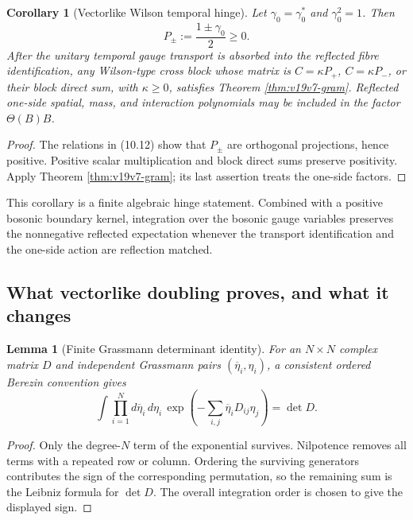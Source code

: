 \documentclass[11pt]{article}
\newtheorem{lemma}[theorem]{Lemma}
\newtheorem{corollary}[theorem]{Corollary}
\theoremstyle{remark}
\begin{document}
\begin{corollary}[Vectorlike Wilson temporal hinge]
\label{cor:v19v7-wilson}
Let \(\gamma_0=\gamma_0^*\) and \(\gamma_0^2=1\).  Then
\[
 P_\pm:=\frac{1\pm\gamma_0}{2}\geq0.                           \tag{10.12}
\]
After the unitary temporal gauge transport is absorbed into the reflected
fibre identification, any Wilson-type cross block whose matrix is
\(C=\kappa P_+\), \(C=\kappa P_-\), or their block direct sum, with
\(\kappa\geq0\), satisfies Theorem \ref{thm:v19v7-gram}.  Reflected
one-side spatial, mass, and interaction polynomials may be included in the
factor \(\Theta(B)B\).
\end{corollary}

\begin{proof}
The relations in (10.12) show that \(P_\pm\) are orthogonal projections,
hence positive.  Positive scalar multiplication and block direct sums
preserve positivity.  Apply Theorem \ref{thm:v19v7-gram}; its last
assertion treats the one-side factors.
\end{proof}

This corollary is a finite algebraic hinge statement.  Combined with a
positive bosonic boundary kernel, integration over the bosonic gauge
variables preserves the nonnegative reflected expectation whenever the
transport identification and the one-side action are reflection matched.

\subsection{What vectorlike doubling proves, and what it changes}

\begin{lemma}[Finite Grassmann determinant identity]
\label{lem:v19v7-det}
For an \(N\times N\) complex matrix \(D\) and independent Grassmann pairs
\((\overline\eta_i,\eta_i)\), a consistent ordered Berezin convention gives
\[
 \int\prod_{i=1}^N d\overline\eta_i\,d\eta_i\,
 \exp\!\left(-\sum_{i,j}\overline\eta_iD_{ij}\eta_j\right)
 =\det D.                                                       \tag{10.13}
\]
\end{lemma}

\begin{proof}
Only the degree-\(N\) term of the exponential survives.  Nilpotence removes
all terms with a repeated row or column.  Ordering the surviving generators
contributes the sign of the corresponding permutation, so the remaining
sum is the Leibniz formula for \(\det D\).  The overall integration order
is chosen to give the displayed sign.
\end{proof}
\end{document}
